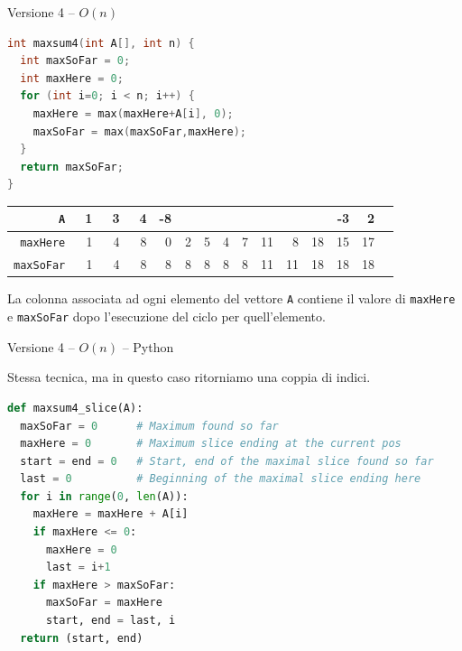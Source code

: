 \begin{frame}[fragile]{Versione 4  -- $O(n)$}

\vspace{-18pt}
\begin{lstlisting}[language=c++]
int maxsum4(int A[], int n) {
  int maxSoFar = 0;
  int maxHere = 0;
  for (int i=0; i < n; i++) {
    maxHere = max(maxHere+A[i], 0);
    maxSoFar = max(maxSoFar,maxHere);
  }  
  return maxSoFar;
}
\end{lstlisting}  
  

\begingroup
\small
\begin{tabular}{|r|r|r|r|r|r|r|r|r|r|r|r|r|r|r|}
\hline
       \texttt{A} & ~1 & ~3 & ~4 & -8 & ~\cellcolor{red!30}{2} & \cellcolor{red!30}{~3} & \cellcolor{red!30}{-1} & \cellcolor{red!30}{~3} & \cellcolor{red!30}{~4} & \cellcolor{red!30}{-3} & \cellcolor{red!30}{10} & -3 &  2 \\\hline\hline
 \texttt{maxHere} & 1 & 4 & 8 &  0 & 2 & 5 &  4 & 7 & 11 &  8 & 18 & 15 & 17 \\\hline
\texttt{maxSoFar} & 1 & 4 & 8 &  8 & 8 & 8 &  8 & 8 & 11 & 11 & 18 & 18 & 18 \\\hline
\end{tabular}

\endgroup

\bigskip
La colonna associata ad ogni elemento del vettore \texttt{A} contiene il valore
di \texttt{maxHere} e \texttt{maxSoFar} dopo l'esecuzione del ciclo
per quell'elemento.

\end{frame}

\begin{frame}[fragile]{Versione 4  -- $O(n)$ -- Python}

\vspace{-6pt}
\begin{mdframed}[style=mybox]
Stessa tecnica, ma in questo caso ritorniamo una coppia di indici.
\end{mdframed}

\small
\vspace{-9pt}
\begin{lstlisting}[language=python]
def maxsum4_slice(A):
  maxSoFar = 0      # Maximum found so far
  maxHere = 0       # Maximum slice ending at the current pos
  start = end = 0   # Start, end of the maximal slice found so far
  last = 0          # Beginning of the maximal slice ending here
  for i in range(0, len(A)):
    maxHere = maxHere + A[i]
    if maxHere <= 0:
      maxHere = 0
      last = i+1 
    if maxHere > maxSoFar:
      maxSoFar = maxHere
      start, end = last, i
  return (start, end)
\end{lstlisting}  
  
\end{frame}  

